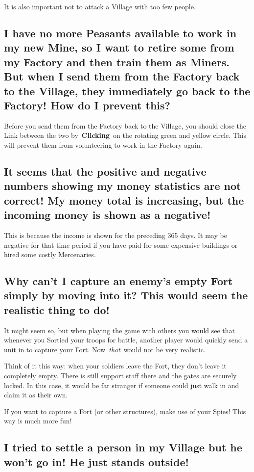 It is also important not to attack a Village with too few people.

\subsection{I have no more Peasants available to work in my new Mine, so I want to retire some from my Factory and then train them as Miners. But when I send them from the Factory back to the Village, they immediately go back to the Factory! How do I prevent this?}

Before you send them from the Factory back to the Village, you should close the Link between the two by \textbf{Clicking} on the rotating green and yellow circle. This will prevent them from volunteering to work in the Factory again.

\subsection{It seems that the positive and negative numbers showing my money statistics are not correct! My money total is increasing, but the incoming money is shown as a negative!}

This is because the income is shown for the preceding 365 days. It may be negative for that time period if you have paid for some expensive buildings or hired some costly Mercenaries.

\subsection{Why can’t I capture an enemy’s empty Fort simply by moving into it? This would seem the realistic thing to do!}

It might seem so, but when playing the game with others you would see that whenever you Sortied your troops for battle, another player would quickly send a unit in to capture your Fort. Now \textit{that} would not be very realistic.

Think of it this way: when your soldiers leave the Fort, they don’t leave it completely empty. There is still support staff there and the gates are securely locked. In this case, it would be far stranger if someone could just walk in and claim it as their own.

If you want to capture a Fort (or other structures), make use of your Spies! This way is much more fun!

\subsection{I tried to settle a person in my Village but he won’t go in! He just stands outside!}

